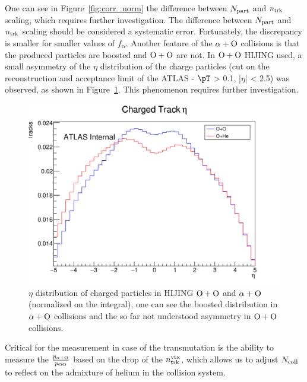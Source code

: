 One can see in Figure~\ref{fig:corr_norm} the difference between $N_{\text{part}}$ and $n_\text{trk}$ scaling, which requires further investigation. The difference between $N_{\text{part}}$ and $n_\text{trk}$ scaling should be considered a systematic error. Fortunately, the discrepancy is smaller for smaller values of $f_{\mathrm{\alpha}}$. Another feature of the $\Oa$ collisions is that the produced particles are boosted and $\OO$ are not. In $\OO$ HIJING used, a small asymmetry of the $\eta$ distribution of the charge particles (cut on the reconstruction and acceptance limit of the ATLAS - $\pT$ > 0.1, |$\eta$| < 2.5) was observed, as shown in Figure~\ref{fig:eta_ntrk}. This phenomenon requires further investigation. 
\begin{figure}[h]
    \centering
    \includegraphics[width=\linewidth]{images/eta_comparison.png}
    \caption{$\eta$ distribution of charged particles in HIJING $\OO$ and $\Oa$ (normalized on the integral), one can see the boosted distribution in $\Oa$ collisions and the so far not understood asymmetry in $\OO$ collisions.}
    \label{fig:eta_ntrk}
\end{figure}

Critical for the measurement in case of the transmutation is the ability to measure the $\frac{p_{\mathrm{\Oa}}}{p_{\mathrm{OO}}}$ based on the drop of the $n_\text{trk}^\text{vtx}$, which allows us to adjust $N_{\text{coll}}$ to reflect on the admixture of helium in the collision system.


